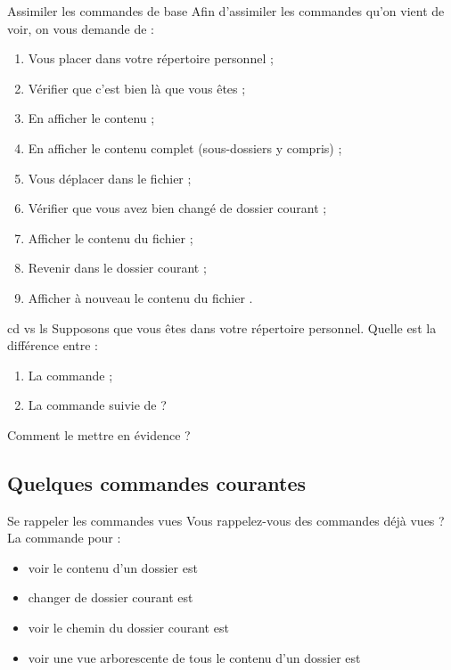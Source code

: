 \documentclass[a4paper,11pt]{style-esi/td}
\begin{document}

		\begin{Exercice}{Assimiler les commandes de base}
			Afin d'assimiler les commandes qu'on vient de voir,
			on vous demande de :
			\begin{enumerate}
				\item Vous placer dans votre répertoire personnel ;
				\item Vérifier que c'est bien là que vous êtes ;
				\item En afficher le contenu ;
				\item En afficher le contenu complet (sous-dossiers y compris) ;
				\item Vous déplacer dans le fichier  ;
				\item Vérifier que vous avez bien changé de dossier courant ;
				\item Afficher le contenu du fichier  ;
				\item Revenir dans le dossier courant ;
				\item Afficher à nouveau le contenu du fichier  .
			\end{enumerate}
		\end{Exercice}

		\begin{Exercice}{cd vs ls}
			Supposons que vous êtes dans votre répertoire personnel.
			Quelle est la différence entre :
			\begin{enumerate}
				\item La commande  ;
				\item La commande  suivie de  ?
			\end{enumerate}
			Comment le mettre en évidence ?
		\end{Exercice}			


	\subsection{Quelques commandes courantes}

		\begin{Exercice}{Se rappeler les commandes vues}		
			Vous rappelez-vous des commandes déjà vues ?
			La commande pour :
			\begin{itemize}
			\item voir le contenu d'un dossier est  
			\item changer de dossier courant est  
			\item voir le chemin du dossier courant est  
			\item voir une vue arborescente de tous le contenu d'un dossier est  
			\end{itemize}
		\end{Exercice}
\end{document}

